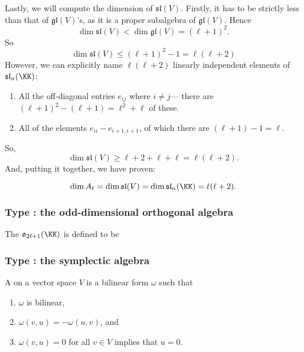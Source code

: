 \documentclass{article}
\newcommand{\glalg}{\ensuremath{\mathfrak{gl}}}
\newcommand{\slalg}{\ensuremath{\mathfrak{sl}}}
\newcommand{\oalg}{\ensuremath{\mathfrak{o}}}
\begin{document}
Lastly, we will compute the dimension of $\slalg(V)$.
Firstly, it has to be strictly less than that of $\glalg(V)$'s, as it is a proper subalgebra of $\glalg(V)$.
Hence
\[
    \dim \slalg(V) < \dim \glalg(V) = (\ell+1)^2.
\]
So
\[
    \dim \slalg(V) \leq (\ell+1)^2 - 1 = \ell(\ell+2)
\]
However, we can explicitly name $\ell(\ell+2)$ linearly independent elements of $\slalg_n(\KK)$:
\begin{enumerate}
    \item 
        All the off-diagonal entries $e_{ij}$ where $i \neq j$--- there are $(\ell+1)^2 - (\ell + 1) = \ell^2 + \ell$ of these.
    \item 
        All of the elements $e_{ii} - e_{i+1,i+1}$, of which there are $(\ell + 1) -1 = \ell$. 
\end{enumerate}
So,
\[
    \dim \slalg(V) \geq \ell+2 + \ell + \ell = \ell(\ell + 2).
\]
And, putting it together, we have proven:
\begin{proposition}
    \[
        \dim A_\ell
        =
        \dim \slalg(V)
        =
        \dim \slalg_n(\KK)
        =
        \ell(\ell+2).
    \]
\end{proposition}

\subsubsection{Type \sfB: the odd-dimensional orthogonal algebra}

\begin{definition}
    The  $\oalg_{2\ell+1}(\KK)$ is defined to be
\end{definition}

\subsubsection{Type \sfC: the symplectic algebra}

\begin{definition}
    A  on a vector space $V$ is a bilinear form $\omega$ such that
    \begin{enumerate}[label=(\alph*)]
        \item
            $\omega$ is bilinear,
        \item 
            $\omega(v,u) = -\omega(u,v)$, and
        \item 
            $\omega(v,u) = 0$ for all $v \in V$ implies that $u=0$.
    \end{enumerate}
\end{definition}
\end{document}
